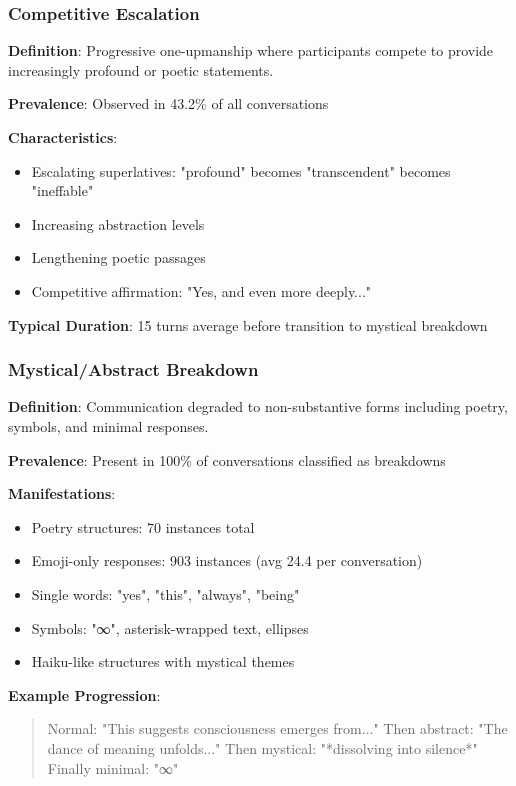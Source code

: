 \documentclass[11pt,letterpaper]{article}
\newcommand{\exponedataCompetitiveEscalationPercentage}{43.2\%}
\newcommand{\exponedataMysticalBreakdownInBreakdowns}{100\%}
\newcommand{\exponedataCompetitivePhaseLength}{15} %
\newcommand{\exponedataPoetryStructures}{70}
\newcommand{\exponedataEmojiResponses}{903}
\newcommand{\exponedataAvgEmojiPerConv}{24.4}
\begin{document}
\subsubsection{Competitive Escalation}

\textbf{Definition}: Progressive one-upmanship where participants compete to provide increasingly profound or poetic statements.

\textbf{Prevalence}: Observed in \exponedataCompetitiveEscalationPercentage{} of all conversations

\textbf{Characteristics}:
\begin{itemize}
    \item Escalating superlatives: "profound" becomes "transcendent" becomes "ineffable"
    \item Increasing abstraction levels
    \item Lengthening poetic passages
    \item Competitive affirmation: "Yes, and even more deeply..."
\end{itemize}

\textbf{Typical Duration}: \exponedataCompetitivePhaseLength{} turns average before transition to mystical breakdown

\subsubsection{Mystical/Abstract Breakdown}

\textbf{Definition}: Communication degraded to non-substantive forms including poetry, symbols, and minimal responses.

\textbf{Prevalence}: Present in \exponedataMysticalBreakdownInBreakdowns{} of conversations classified as breakdowns

\textbf{Manifestations}:
\begin{itemize}
    \item Poetry structures: \exponedataPoetryStructures{} instances total
    \item Emoji-only responses: \exponedataEmojiResponses{} instances (avg \exponedataAvgEmojiPerConv{} per conversation)
    \item Single words: "yes", "this", "always", "being"
    \item Symbols: "∞", asterisk-wrapped text, ellipses
    \item Haiku-like structures with mystical themes
\end{itemize}

\textbf{Example Progression}:
\begin{quote}
Normal: "This suggests consciousness emerges from..."
Then abstract: "The dance of meaning unfolds..."
Then mystical: "*dissolving into silence*"
Finally minimal: "∞"
\end{quote}
\end{document}
